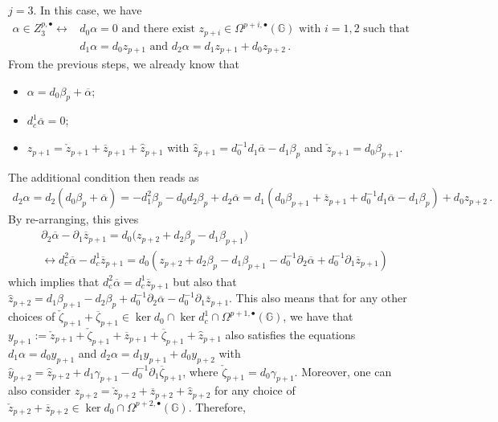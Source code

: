\documentclass[dvipsnames]{amsart}
\theoremstyle{definition}
\theoremstyle{definition}
\numberwithin{equation}{section}
\newcommand{\G}{\mathbb{G}}
\begin{document}
\medskip
{$j=3$}. In this case, we have
\begin{align*}
    \alpha\in Z_3^{p,\bullet}\longleftrightarrow &d_0\alpha=0\text{ and there exist }z_{p+i}\in\Omega^{p+i,\bullet}(\G)\text{ with }i=1,2\text{ such that }\\
    &d_1\alpha=d_0z_{p+1}\text{ and }d_2\alpha=d_1z_{p+1}+d_0z_{p+2}\,.
\end{align*}
From the previous steps, we already know that
\begin{itemize}
    \item $\alpha=d_0\beta_p+\overline{\alpha}$;
    \item $d_c^1\overline{\alpha}=0$;
    \item $z_{p+1}=\check{z}_{p+1}+\overline{z}_{p+1}+\hat{z}_{p+1}$ with $\hat{z}_{p+1}=d_0^{-1}d_1\overline{\alpha}-d_1\beta_p$ and $\check{z}_{p+1}=d_0\beta_{p+1}$.
\end{itemize}
The additional condition then reads as
\begin{align*}
    d_2\alpha=d_2(d_0\beta_p+\overline{\alpha})=-d_1^2\beta_p-d_0d_2\beta_p+d_2\overline{\alpha}=d_1(d_0\beta_{p+1}+\overline{z}_{p+1}+d_0^{-1}d_1\overline{\alpha}-d_1\beta_p)+d_0z_{p+2}\,.
\end{align*}
By re-arranging, this gives
\begin{align*}
    &\partial_2\overline{\alpha}-\partial_1\overline{z}_{p+1}=d_0\big(z_{p+2}+d_2\beta_p-d_1\beta_{p+1}\big)\\&\longleftrightarrow d_c^2\overline{\alpha}-d_c^1\overline{z}_{p+1}=d_0(z_{p+2}+d_2\beta_p-d_1\beta_{p+1}-d_0^{-1}\partial_2\overline{\alpha}+d_0^{-1}\partial_1\overline{z}_{p+1})
\end{align*}
which implies that $d_c^2\overline{\alpha}=d_c^1\overline{z}_{p+1}$ but also that $\hat{z}_{p+2}=d_1\beta_{p+1}-d_2\beta_p+d_0^{-1}\partial_2\overline{\alpha}-d_0^{-1}\partial_1\overline{z}_{p+1}$. This also means that for any other choices of $\check{\zeta}_{p+1}+\overline{\zeta}_{p+1}\in\ker d_0\cap\ker d_c^1\cap\Omega^{p+1,\bullet}(\G)$, we have that ${y}_{p+1}:=\check{z}_{p+1}+\check{\zeta}_{p+1}+\overline{z}_{p+1}+\overline{\zeta}_{p+1}+\hat{z}_{p+1}$ also satisfies the equations $d_1\alpha=d_0{y}_{p+1}$ and $d_2\alpha=d_1y_{p+1}+d_0y_{p+2}$ with $\hat{y}_{p+2}=\hat{z}_{p+2}+d_1\gamma_{p+1}-d_0^{-1}\partial_1\overline{\zeta}_{p+1}$, where $\check{\zeta}_{p+1}=d_0\gamma_{p+1}$. Moreover, one can also consider $z_{p+2}=\check{z}_{p+2}+\overline{z}_{p+2}+\hat{z}_{p+2}$ for any choice of $\check{z}_{p+2}+\overline{z}_{p+2}\in\ker d_0\cap\Omega^{p+2,\bullet}(\G)$. Therefore, 
\end{document}
